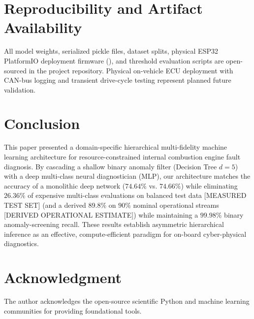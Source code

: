 \documentclass[journal]{IEEEtran}
\begin{document}
\section{Reproducibility and Artifact Availability}
All model weights, serialized pickle files, dataset splits, physical ESP32 PlatformIO deployment firmware (), and threshold evaluation scripts are open-sourced in the project repository. Physical on-vehicle ECU deployment with CAN-bus logging and transient drive-cycle testing represent planned future validation.

\section{Conclusion}
This paper presented a domain-specific hierarchical multi-fidelity machine learning architecture for resource-constrained internal combustion engine fault diagnosis. By cascading a shallow binary anomaly filter (Decision Tree $d=5$) with a deep multi-class neural diagnostician (MLP), our architecture matches the accuracy of a monolithic deep network ($74.64\%$ vs. $74.66\%$) while eliminating $26.36\%$ of expensive multi-class evaluations on balanced test data [MEASURED TEST SET] (and a derived $89.8\%$ on $90\%$ nominal operational streams [DERIVED OPERATIONAL ESTIMATE]) while maintaining a $99.98\%$ binary anomaly-screening recall. These results establish asymmetric hierarchical inference as an effective, compute-efficient paradigm for on-board cyber-physical diagnostics.

\section*{Acknowledgment}
The author acknowledges the open-source scientific Python and machine learning communities for providing foundational tools.



\end{document}
